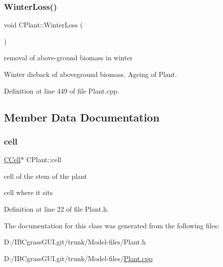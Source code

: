 \subsubsection{\texorpdfstring{WinterLoss()}{WinterLoss()}}
{\footnotesize\ttfamily void C\+Plant\+::\+Winter\+Loss (\begin{DoxyParamCaption}{ }\end{DoxyParamCaption})}



removal of above-\/ground biomass in winter 

Winter dieback of aboveground biomass. Ageing of Plant. 

Definition at line 449 of file Plant.\+cpp.



\subsection{Member Data Documentation}
\mbox{\label{class_c_plant_aa4e3f8bc03674d5017a44b6bc01faf4e}} 
\subsubsection{\texorpdfstring{cell}{cell}}
{\footnotesize\ttfamily \mbox{\hyperlink{class_c_cell}{C\+Cell}}$\ast$ C\+Plant\+::cell\hspace{0.3cm}{\ttfamily [protected]}}



cell of the stem of the plant 

cell where it sits 

Definition at line 22 of file Plant.\+h.



The documentation for this class was generated from the following files\+:\begin{DoxyCompactItemize}
\item 
D\+:/\+I\+B\+Cgrass\+G\+U\+I.\+git/trunk/\+Model-\/files/Plant.\+h\item 
D\+:/\+I\+B\+Cgrass\+G\+U\+I.\+git/trunk/\+Model-\/files/\mbox{\hyperlink{_plant_8cpp}{Plant.\+cpp}}\end{DoxyCompactItemize}

